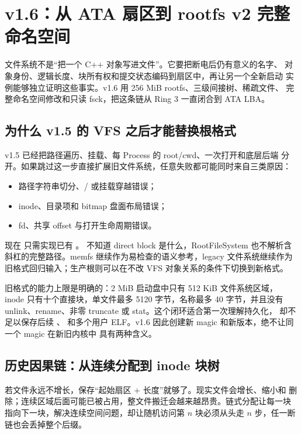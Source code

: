 \section{v1.6：从 ATA 扇区到 rootfs v2 完整命名空间}

\begin{keyidea}
文件系统不是“把一个 C++ 对象写进文件”。它要把断电后仍有意义的名字、
对象身份、逻辑长度、块所有权和提交状态编码到扇区中，再让另一个全新启动
实例能够独立证明这些事实。v1.6 用 256 MiB rootfs、三级间接树、稀疏文件、
完整命名空间修改和只读 fsck，把这条链从 Ring 3 一直闭合到 ATA LBA。
\end{keyidea}

\subsection{为什么 v1.5 的 VFS 之后才能替换根格式}

v1.5 已经把路径遍历、挂载、每 Process 的 root/cwd、一次打开和底层后端
分开。如果跳过这一步直接扩展旧文件系统，任意失败都可能同时来自三类原因：

\begin{itemize}
  \item 路径字符串切分、/ 或挂载穿越错误；
  \item inode、目录项和 bitmap 盘面布局错误；
  \item fd、共享 offset 与打开生命周期错误。
\end{itemize}

现在  只需实现已有 。
 不知道 direct block 是什么，RootFileSystem 也不解析含
斜杠的完整路径。memfs 继续作为易检查的语义参考，legacy 文件系统继续作为
旧格式回归输入；生产根则可以在不改 VFS 对象关系的条件下切换到新格式。

旧格式的能力上限是明确的：2 MiB 启动盘中只有 512 KiB 文件系统区域，
inode 只有十个直接块，单文件最多 5120 字节，名称最多 40 字节，并且没有
unlink、rename、非零 truncate 或 stat。这个闭环适合第一次理解持久化，
却不足以保存后续 、 和多个用户
ELF。v1.6 因此创建新 magic 和新版本，绝不让同一个 magic 在新旧内核中
具有两种含义。

\subsection{历史因果链：从连续分配到 inode 块树}

若文件永远不增长，保存“起始扇区 + 长度”就够了。现实文件会增长、缩小和
删除；连续区域后面可能已被占用，整文件搬迁会越来越昂贵。链式分配让每一块
指向下一块，解决连续空间问题，却让随机访问第 \(n\) 块必须从头走 \(n\)
步，任一断链也会丢掉整个后缀。

